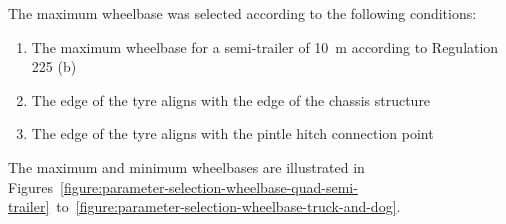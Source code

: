 The maximum wheelbase was selected according to the following conditions:

\begin{enumerate}
	\item The maximum wheelbase for a semi-trailer of 10~m according to Regulation 225 (b)
	\item The edge of the tyre aligns with the edge of the chassis structure
	\item The edge of the tyre aligns with the pintle hitch connection point
\end{enumerate}

The maximum and minimum wheelbases are illustrated in Figures~\ref{figure:parameter-selection-wheelbase-quad-semi-trailer}~to~\ref{figure:parameter-selection-wheelbase-truck-and-dog}.

